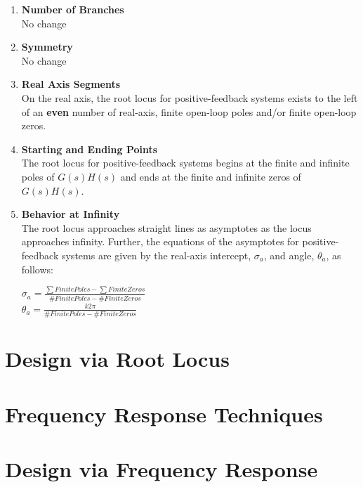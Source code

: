 \documentclass[11pt]{article}
\begin{document}
    \begin{enumerate}
        \item \textbf{Number of Branches} \\
        No change
        \item \textbf{Symmetry} \\
        No change
        \item \textbf{Real Axis Segments} \\
        On the real axis, the root locus for positive-feedback systems exists to the left of an \textbf{even} number of real-axis, finite open-loop poles and/or finite open-loop zeros.
        \item \textbf{Starting and Ending Points} \\
        The root locus for positive-feedback systems begins at the finite and infinite poles of $G(s)H(s)$ and ends at the finite and infinite zeros of $G(s)H(s)$.
        \item \textbf{Behavior at Infinity} \\        
        The root locus approaches straight lines as asymptotes as the locus approaches infinity. Further, the equations of the asymptotes for positive-feedback systems are given by the real-axis intercept, $\sigma_a$, and angle, $\theta_a$, as follows: \\
        \begin{center}
            $\sigma_a = \frac{\sum Finite Poles - \sum Finite Zeros}{\# Finite Poles - \# Finite Zeros}$ \\

            $\theta_a = \frac{k2\pi}{\# Finite Poles - \# Finite Zeros}$
        \end{center}    
        \end{enumerate}

    \pagebreak


    \section{Design via Root Locus}

    \pagebreak


    \section{Frequency Response Techniques}

    \pagebreak


    \section{Design via Frequency Response}
    
    \pagebreak


    
\end{document}
